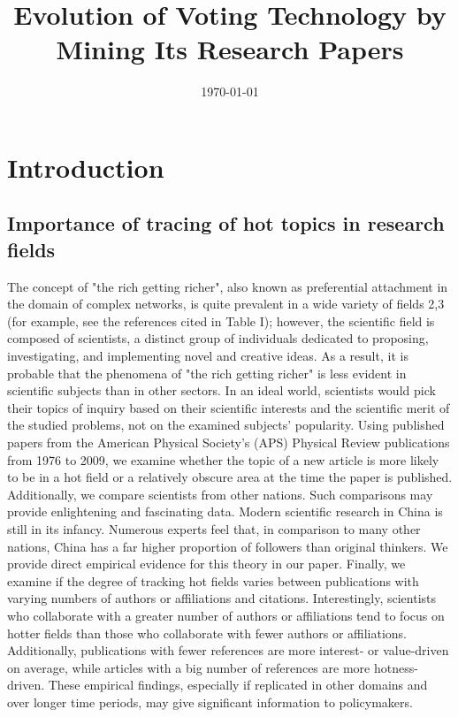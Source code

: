 \documentclass{article}
\title{Evolution of Voting Technology by Mining Its Research Papers}
\author{}
\date{\today}
\begin{document}
\maketitle

\begin{abstract}

\end{abstract}
\section{Introduction}

\subsection{Importance of tracing of hot topics in research fields}
The concept of "the rich getting richer", also known as preferential attachment in the domain of complex networks, is quite prevalent in a wide variety of fields 2,3 (for example, see the references cited in Table I); however, the scientific field is composed of scientists, a distinct group of individuals dedicated to proposing, investigating, and implementing novel and creative ideas.
As a result, it is probable that the phenomena of "the rich getting richer" is less evident in scientific subjects than in other sectors.
In an ideal world, scientists would pick their topics of inquiry based on their scientific interests and the scientific merit of the studied problems, not on the examined subjects' popularity.
Using published papers from the American Physical Society's (APS) Physical Review publications from 1976 to 2009, we examine whether the topic of a new article is more likely to be in a hot field or a relatively obscure area at the time the paper is published.
Additionally, we compare scientists from other nations.
Such comparisons may provide enlightening and fascinating data.
Modern scientific research in China is still in its infancy.
Numerous experts feel that, in comparison to many other nations, China has a far higher proportion of followers than original thinkers.
We provide direct empirical evidence for this theory in our paper.
Finally, we examine if the degree of tracking hot fields varies between publications with varying numbers of authors or affiliations and citations.
Interestingly, scientists who collaborate with a greater number of authors or affiliations tend to focus on hotter fields than those who collaborate with fewer authors or affiliations.
Additionally, publications with fewer references are more interest- or value-driven on average, while articles with a big number of references are more hotness-driven.
These empirical findings, especially if replicated in other domains and over longer time periods, may give significant information to policymakers. 
\end{document}
